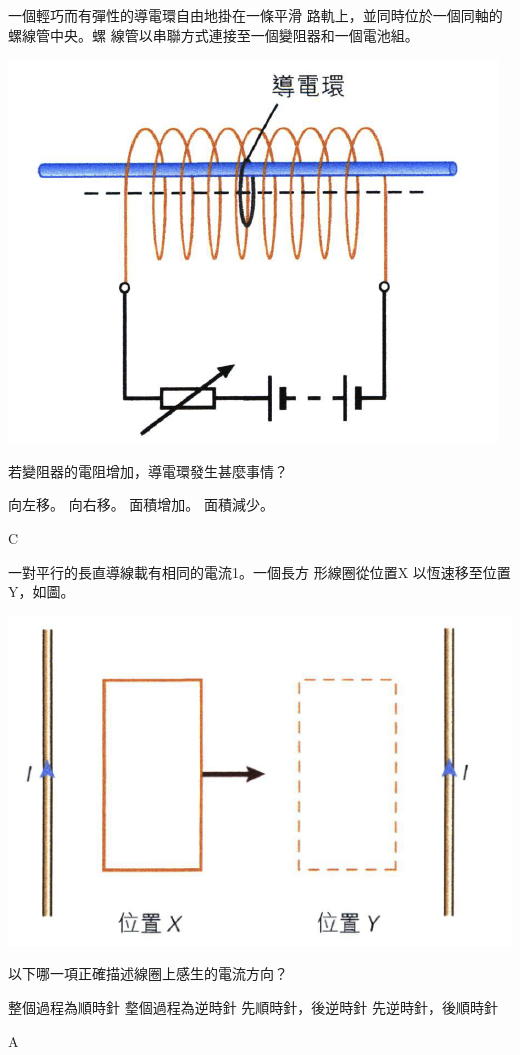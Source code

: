 {
    一個輕巧而有彈性的導電環自由地掛在一條平滑 路軌上，並同時位於一個同軸的螺線管中央。螺 線管以串聯方式連接至一個變阻器和一個電池組。
    \par{\par\centering\includegraphics[width=.3\textwidth]{./img/ch5_induction_mc_2024-06-24-16-49-17.png}\par}
    若變阻器的電阻增加，導電環發生甚麼事情？
    \begin{tasks}
        \task 向左移。
        \task 向右移。
        \task 面積增加。
        \task 面積減少。
    \end{tasks}
}{C}

{
    一對平行的長直導線載有相同的電流1。一個長方 形線圈從位置X 以恆速移至位置Y，如圖。
    \par{\par\centering\includegraphics[width=.35\textwidth]{./img/ch5_induction_mc_2024-06-24-16-53-10.png}\par}
    以下哪一項正確描述線圈上感生的電流方向？
    \begin{tasks}
        \task 整個過程為順時針
        \task 𤨣個過程為逆時針
        \task 先順時針，後逆時針
        \task 先逆時針，後順時針
    \end{tasks}
}{A}

